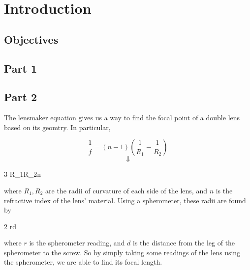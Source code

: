 \chapter{Introduction}

\section{Objectives}

\section{Part 1}

\section{Part 2}
The lensmaker equation gives us a way to find the focal point of a double lens based on its geomtry. In particular,

\[ \frac{1}{f} = \left(n-1\right)\left(\frac{1}{R_1} - \frac{1}{R_2}\right) \]
\[ \Downarrow \]

{3}{}
{{R_1}{R_2}{n}}

where $R_1, R_2$ are the radii of curvature of each side of the lens, and $n$ is the refractive index of the lens' material. Using a spherometer, these radii are found by

{2}{}
{{r}{d}}

where $r$ is the spherometer reading, and $d$ is the distance from the leg of the spherometer to the screw. So by simply taking some readings of the lens using the spherometer, we are able to find its focal length.